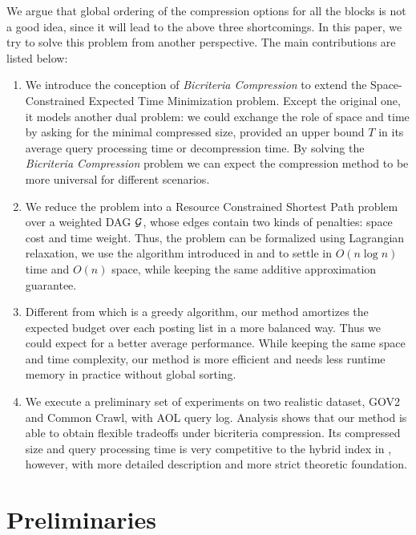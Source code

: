 \documentclass{sig-alternate-05-2015}
\begin{document}
We argue that global ordering of the compression options for all the blocks is not a good idea, since it will lead to the above three shortcomings.
In this paper, we try to solve this problem from another perspective.
The main contributions are listed below:
\begin{enumerate}
	\item We introduce the conception of \textit{Bicriteria Compression} \cite{farruggia2014bicriteria} to extend the Space-Constrained Expected Time Minimization problem.
	Except the original one, it models another dual problem: we could exchange the role of space and time by asking for the minimal compressed size, provided an upper bound $ T $ in its average query processing time or decompression time.
	By solving the \textit{Bicriteria Compression} problem we can expect the compression method to be more universal for different scenarios.
	\item We reduce the problem into a Resource Constrained Shortest Path problem \cite{mehlhorn2000resource} over a weighted DAG $ \cal G $, whose edges contain two kinds of penalties: space cost and time weight.
	Thus, the problem can be formalized using Lagrangian relaxation, we use the algorithm introduced in \cite{farruggia2014bicriteria} and \cite{handler1980dual} to settle in $ O(n\log n) $ time and $ O(n) $ space, while keeping the same additive approximation guarantee.
	\item Different from \cite{ottaviano2015optimal} which is a greedy algorithm, our method amortizes the expected budget over each posting list in a more balanced way.
	Thus we could expect for a better average performance.
	While keeping the same space and time complexity, our method is more efficient and needs less runtime memory in practice without global sorting.
	\item We execute a preliminary set of experiments on two realistic dataset, GOV2 and Common Crawl, with AOL query log.
	Analysis shows that our method is able to obtain flexible tradeoffs under bicriteria compression.
	Its compressed size and query processing time is very competitive to the hybrid index in \cite{ottaviano2015optimal}, however, with more detailed description and more strict theoretic foundation.
\end{enumerate}

\section{Preliminaries}\label{sec: preliminaries}
\end{document}
